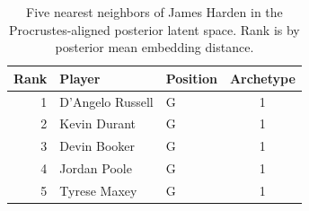 \begin{table}[htbp]
  \centering\small
  \begin{tabular}{rllc}
    \toprule
    Rank & Player & Position & Archetype \\
    \midrule
    1 & D'Angelo Russell & G & 1 \\
    2 & Kevin Durant & G & 1 \\
    3 & Devin Booker & G & 1 \\
    4 & Jordan Poole & G & 1 \\
    5 & Tyrese Maxey & G & 1 \\
    \bottomrule
  \end{tabular}
  \caption{Five nearest neighbors of James Harden in the Procrustes-aligned posterior latent space. Rank is by posterior mean embedding distance.}
  \label{tab:James_Harden_neighbors}
\end{table}

